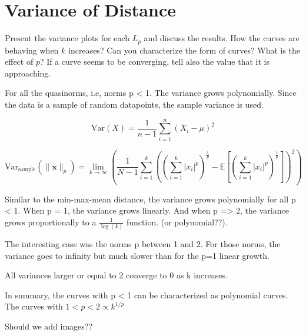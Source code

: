 
\section{Variance of Distance}\label{sec:variance}
Present the variance plots for each \( L_p \) and discuss the results. How the curves are behaving when \( k \) increases? Can you characterize the form of curves? What is the effect of \( p \)? If a curve seems to be converging, tell also the value that it is approaching.



For all the quasinorms, i.e, norms p < 1. The variance grows polynomially. Since the data is a sample of random datapoints, the sample variance is used.

\[
    \text{Var}(X) = \frac{1}{n -1 } \sum_{i=1}^{n} \left(X_i - \mu \right)^2
\]


\begin{equation}
    \text{Var}_{\text{sample}}\left(\|\mathbf{x}\|_p\right) = \lim_{k \to \infty} \left( \frac{1}{N - 1} \sum_{i=1}^{k} \left( \left( \sum_{i=1}^{k} |x_i|^p \right)^{\frac{1}{p}} - \mathbb{E}\left[\left( \sum_{i=1}^{k} |x_i|^p \right)^{\frac{1}{p}}\right] \right)^2 \right)
\end{equation}

Similar to the min-max-mean distance, the variance grows polynomially for all p < 1. When p = 1, the variance grows linearly. And when p => 2, the variance grows proportionally to a \(\frac{1}{\log(k)}\) function. (or polynomial??).

The interesting case was the norms p between 1 and 2. For those norms, the variance goes to infinity but much slower than for the p=1 linear growth.

All variances larger or equal to 2 converge to 0 as k increases.

In summary, the curves with p < 1 can be characterized as polynomial curves. The curves with $ 1 < p < 2 \propto k^{1/p}$

Should we add images??
